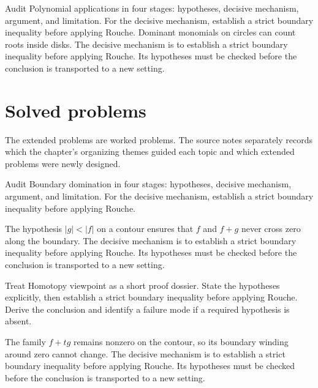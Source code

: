\begin{example}\label{ex:iv13-worked-04}
Audit Polynomial applications in four stages: hypotheses, decisive mechanism, argument, and limitation. For the decisive mechanism, establish a strict boundary inequality before applying Rouche. Dominant monomials on circles can count roots inside disks. The decisive mechanism is to establish a strict boundary inequality before applying Rouche. Its hypotheses must be checked before the conclusion is transported to a new setting.
\end{example}

\section{Solved problems}
The extended problems are worked problems. The source notes separately records which the chapter's organizing themes guided each topic and which extended problems were newly designed.

\begin{problem}\label{prob:iv13-problem-01}
Audit Boundary domination in four stages: hypotheses, decisive mechanism, argument, and limitation. For the decisive mechanism, establish a strict boundary inequality before applying Rouche.
\end{problem}
\begin{solution}
The hypothesis $|g|<|f|$ on a contour ensures that $f$ and $f+g$ never cross zero along the boundary. The decisive mechanism is to establish a strict boundary inequality before applying Rouche. Its hypotheses must be checked before the conclusion is transported to a new setting.
\end{solution}

\begin{problem}\label{prob:iv13-problem-02}
Treat Homotopy viewpoint as a short proof dossier. State the hypotheses explicitly, then establish a strict boundary inequality before applying Rouche. Derive the conclusion and identify a failure mode if a required hypothesis is absent.
\end{problem}
\begin{solution}
The family $f+t g$ remains nonzero on the contour, so its boundary winding around zero cannot change. The decisive mechanism is to establish a strict boundary inequality before applying Rouche. Its hypotheses must be checked before the conclusion is transported to a new setting.
\end{solution}

